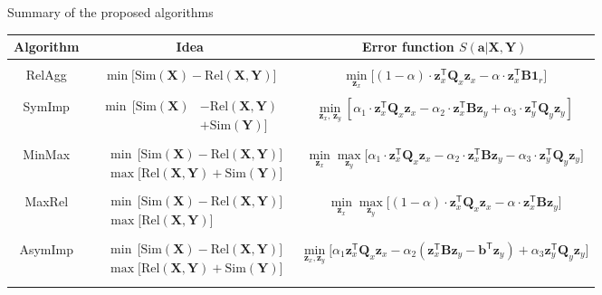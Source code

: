 \documentclass[9pt]{beamer}
\newcommand{\bz}{\mathbf{z}}
\newcommand{\ba}{\mathbf{a}}
\newcommand{\bb}{\mathbf{b}}
\newcommand{\bY}{\mathbf{Y}}
\newcommand{\bX}{\mathbf{X}}
\newcommand{\bB}{\mathbf{B}}
\newcommand{\bQ}{\mathbf{Q}}
\newcommand{\bOne}{\boldsymbol{1}}
\newcommand{\T}{\mathsf{T}}
\begin{document}
\begin{frame}{Summary of the proposed algorithms}
\begin{table}
	\centering
	\footnotesize{
		\begin{tabular}{c|c|c}
			\hline
			Algorithm & Idea & Error function $S(\ba | \bX, \bY)$ \\
			\hline && \\ 
			RelAgg & $\min \bigl[ \text{Sim}(\bX) - \text{Rel}(\bX, \bY) \bigr] $ & $\min\limits_{\bz_x} \bigl[ (1 - \alpha) \cdot \bz_x^{\T} \bQ_x \bz_x - \alpha \cdot \bz_x^{\T} \bB \bOne_r \bigr] $ \\ &&\\
			SymImp & $\begin{aligned} \min \, \bigl[ \text{Sim}(\bX) & - \text{Rel}(\bX, \bY) \\ & + \text{Sim}(\bY) \bigr] \end{aligned}$ & $ \min\limits_{\bz_x, \, \bz_y} \left[ \alpha_1 \cdot \bz_x^{\T} \bQ_x \bz_x - \alpha_2 \cdot \bz_x^{\T} \bB \bz_y + \alpha_3 \cdot \bz_y^{\T} \bQ_y \bz_y \right] $\\ &&\\ 
			MinMax & $\begin{aligned} &\min \, \bigl[ \text{Sim}(\bX) - \text{Rel}(\bX, \bY) \bigr]  \\ & \max \bigl[\text{Rel}(\bX, \bY) + \text{Sim}(\bY) \bigr] \end{aligned}$ & $	\min\limits_{\bz_x} 	\max\limits_{\bz_y} \bigl[\alpha_1 \cdot \bz_x^{\T} \bQ_x \bz_x - \alpha_2 \cdot \bz_x^{\T} \bB \bz_y - \alpha_3 \cdot \bz_y^{\T} \bQ_y \bz_y \bigr]$ \\ &&\\ 
			MaxRel & $\begin{aligned} &\min \, \bigl[ \text{Sim}(\bX) - \text{Rel}(\bX, \bY) \bigr]  \\ & \max \bigl[\text{Rel}(\bX, \bY) \bigr] \end{aligned}$& $\min\limits_{\bz_x} 	\max\limits_{\bz_y} \bigl[ (1 - \alpha) \cdot \bz_x^{\T} \bQ_x \bz_x - \alpha \cdot \bz_x^{\T} \bB \bz_y \bigr]$ \\ 		&&\\
			AsymImp & $\begin{aligned} & \min \, \bigl[ \text{Sim}(\bX) - \text{Rel}(\bX, \bY) \bigr]\\ &  \max \bigl[\text{Rel}(\bX, \bY) + \text{Sim}(\bY) \bigr] \end{aligned}$ & $\min\limits_{\bz_x, \bz_y} \bigl[ \alpha_1 \bz_x^{\T} \bQ_x \bz_x - \alpha_2 \left(\bz_x^{\T} \bB \bz_y - \bb^{\T} \bz_y \right) + \alpha_3  \bz_y^{\T} \bQ_y \bz_y \bigr]$\\  && \\
			\hline
	\end{tabular}}
\end{table}
\end{frame}
\end{document}
